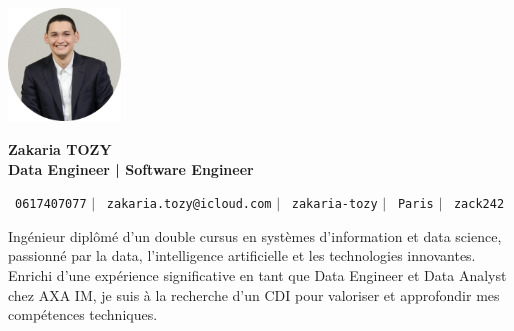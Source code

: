 \documentclass[11pt,a4paper]{article}
\begin{document}
\begin{flushleft}
  \begin{minipage}[c]{0.2\textwidth}
    \includegraphics[width=3cm]{images/profilpicture.png}
  \end{minipage}%
  \begin{minipage}[c]{0.8\textwidth}
    {\Huge \textbf{Zakaria TOZY}} \\[2pt]
    {\Large \textbf{Data Engineer | Software Engineer }}
  \end{minipage}
\end{flushleft}

\vspace{-8pt}

\begin{center}
    \small \faPhone\ \texttt{0617407077} \hspace{1pt} $|$
    \hspace{1pt} \faEnvelope\ \texttt{zakaria.tozy@icloud.com} \hspace{1pt} $|$
    \hspace{1pt} \faLinkedin\ \texttt{zakaria-tozy} \hspace{1pt} $|$
    \hspace{1pt} \faMapMarker\ \texttt{Paris} \hspace{1pt} $|$
    \hspace{1pt} \faGithub\ \texttt{zack242} \\ \vspace{0pt}
\end{center}

\begin{itemize}[leftmargin=0in, label={}]
\footnotesize{\item{
Ingénieur diplômé d'un double cursus en systèmes d'information et data science, passionné par la data, l'intelligence artificielle et les technologies innovantes. Enrichi d'une expérience significative en tant que Data Engineer et Data Analyst chez AXA IM, je suis à la recherche d'un CDI pour valoriser et approfondir mes compétences techniques.
}}
\end{itemize}
\end{document}
